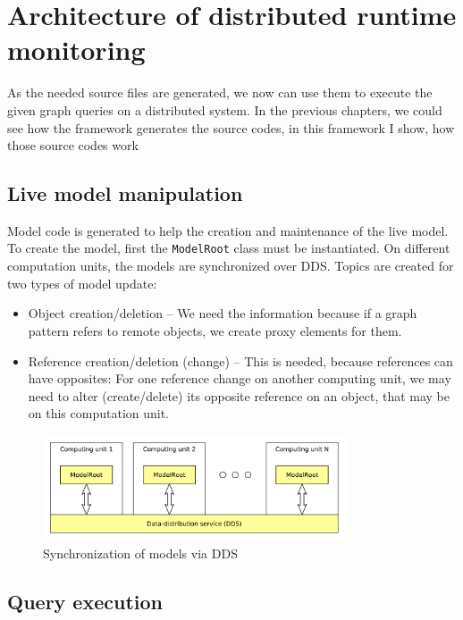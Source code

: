 %
\chapter{Architecture of distributed runtime monitoring}
%

As the needed source files are generated, we now can use them to execute the given graph queries on a distributed system. 
In the previous chapters, we could see how the framework generates the source codes, in this framework I show, how those source codes work



\section{Live model manipulation}
Model code is generated to help the creation and maintenance of the live model.
To create the model, first the \texttt{ModelRoot} class must be instantiated.
On different computation units, the models are synchronized over DDS.
Topics are created for two types of model update:
\begin{itemize}
	\item Object creation/deletion -- We need the information because if a graph pattern refers to remote objects, we create proxy elements for them.  
	\item Reference creation/deletion (change) -- This is needed, because references can have opposites: For one reference change on another computing unit, we may need to alter (create/delete) its opposite reference on an object, that may be on this computation unit.
\end{itemize}

\begin{figure}[H]
	\begin{center}
		\includegraphics[width=0.8\textwidth]{figures/model-dds.pdf}
		\caption{ Synchronization of models via DDS }
		\label{fig:model-dds}
	\end{center}
\end{figure}

\section{Query execution}

